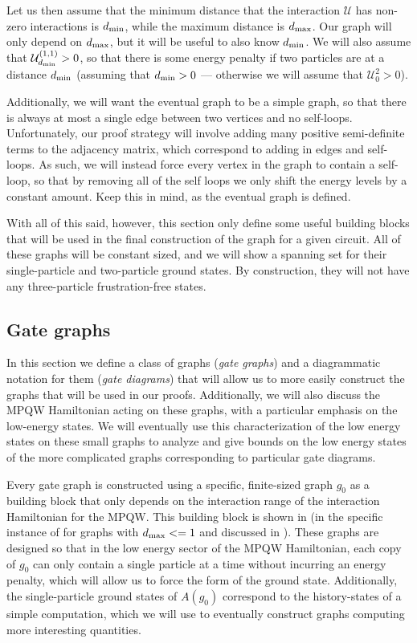 \documentclass[../thesis-main/thesis-main]{subfiles}
\begin{document}
Let us then assume that the minimum distance that the interaction $\mathcal{U}$ has non-zero interactions is $d_{\text{min}}$, while the maximum distance is $d_{\text{max}}$.  Our graph will only depend on $d_{\text{max}}$, but it will be useful to also know $d_{\text{min}}$.  We will also assume that $\mathcal{U}_{d_{\text{min}}}^{(1,1)} > 0$, so that there is some energy penalty if two particles are at a distance $d_{\text{min}}$ (assuming that $d_{\text{min}} > 0$ --- otherwise we will assume that $\mathcal{U}_0^{2} > 0$).

Additionally, we will want the eventual graph to be a simple graph, so that there is always at most a single edge between two vertices and no self-loops.  Unfortunately, our proof strategy will involve adding many positive semi-definite terms to the adjacency matrix, which correspond to adding in edges and self-loops.  As such, we will instead force every vertex in the graph to contain a self-loop, so that by removing all of the self loops we only shift the energy levels by a constant amount.  Keep this in mind, as the eventual graph is defined.

With all of this said, however, this section only define some useful building blocks that will be used in the final construction of the graph for a given circuit.  All of these graphs will be constant sized, and we will show a spanning set for their single-particle and two-particle ground states.  By construction, they will not have any three-particle frustration-free states.

\subsection{Gate graphs}\label{sec:gate_graphs}

In this section we define a class of graphs (\emph{gate graphs}) and a diagrammatic notation for them (\emph{gate diagrams}) that will allow us to more easily construct the graphs that will be used in our proofs.  Additionally, we will also discuss the MPQW Hamiltonian acting on these graphs, with a particular emphasis on the low-energy states.  We will eventually use this characterization of the low energy states on these small graphs to analyze and give bounds on the low energy states of the more complicated graphs corresponding to particular gate diagrams.

Every gate graph is constructed using a specific, finite-sized graph $g_{0}$ as a building block that only depends on the interaction range of the interaction Hamiltonian for the MPQW.  This building block is shown in  (in the specific instance of for graphs with $d_{\text{max}} <= 1$ and discussed in ).  These graphs are designed so that in the low energy sector of the MPQW Hamiltonian, each copy of $g_0$ can only contain a single particle at a time without incurring an energy penalty, which will allow us to force the form of the ground state.  Additionally, the single-particle ground states of $A(g_0)$ correspond to the history-states of a simple computation, which we will use to eventually construct graphs computing more interesting quantities.  
\end{document}
